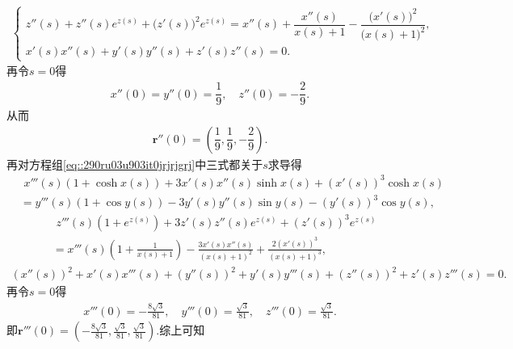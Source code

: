 \documentclass[../../main.tex]{subfiles}%
\begin{document}
\begin{solution}
\begin{align}
\begin{cases}
z''(s) + z''(s)e^{z(s)} + \big(z'(s)\big)^2e^{z(s)} = x''(s) + \dfrac{x''(s)}{x(s) + 1} - \dfrac{\big(x'(s)\big)^2}{\big(x(s) + 1\big)^2}, \\
x'(s)x''(s) + y'(s)y''(s) + z'(s)z''(s) = 0.
\end{cases}
\end{align}
再令$s=0$得
\begin{align*}
x''(0) = y''(0) = \dfrac{1}{9}, \quad z''(0) = -\dfrac{2}{9}.
\end{align*}
从而
\begin{align*}
\bm{r}''(0) = \left( \dfrac{1}{9}, \dfrac{1}{9}, -\dfrac{2}{9} \right).
\end{align*}
再对方程组\eqref{eq::290ru03u903it0jrjrjgrj}中三式都关于$s$求导得
\begin{align*}
&\,\,x''' \left( s \right) \left( 1+\cosh x\left( s \right) \right) +3x' \left( s \right) x'' \left( s \right) \sinh x\left( s \right) +\left( x' \left( s \right) \right) ^3\cosh x\left( s \right) 
\\
&=y''' \left( s \right) \left( 1+\cos y\left( s \right) \right) -3y' \left( s \right) y'' \left( s \right) \sin y\left( s \right) -\left( y' \left( s \right) \right) ^3\cos y\left( s \right), 
\end{align*}
\begin{align*}
&\,\,z''' \left( s \right) \left( 1+e^{z\left( s \right)} \right) +3z' \left( s \right) z'' \left( s \right) e^{z\left( s \right)}+\left( z' \left( s \right) \right) ^3e^{z\left( s \right)}
\\
&=x''' \left( s \right) \left( 1+\frac{1}{x\left( s \right) +1} \right) -\frac{3x' \left( s \right) x'' \left( s \right)}{\left( x\left( s \right) +1 \right) ^2}+\frac{2\left( x' \left( s \right) \right) ^3}{\left( x\left( s \right) +1 \right) ^3},
\end{align*}
\begin{align*}
\left( x'' \left( s \right) \right) ^2+x' \left( s \right) x''' \left( s \right) +\left( y'' \left( s \right) \right) ^2+y' \left( s \right) y''' \left( s \right) +\left( z'' \left( s \right) \right) ^2+z' \left( s \right) z''' \left( s \right) =0.
\end{align*}
再令$s=0$得
\begin{align*}
x''' \left( 0 \right) =-\frac{8\sqrt{3}}{81},\quad y''' \left( 0 \right) =\frac{\sqrt{3}}{81},\quad z''' \left( 0 \right) =\frac{\sqrt{3}}{81}.
\end{align*}
即$\boldsymbol{r}''' \left( 0 \right) =\left( -\frac{8\sqrt{3}}{81},\frac{\sqrt{3}}{81},\frac{\sqrt{3}}{81} \right) .$综上可知

\end{solution}
\end{document}
